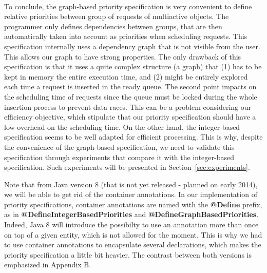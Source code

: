 \documentclass[11pt]{report}
\begin{document}

\paragraph{}
To conclude, the graph-based priority specification is very convenient to define relative priorities between group of requests of multiactive objects. The programmer only defines dependencies between groups, that are then automatically taken into account as priorities when scheduling requests. This specification internally uses a dependency graph that is not visible from the user. This allows our graph to have strong properties. The only drawback of this specification is that it uses a quite complex structure (a graph) that (1) has to be kept in memory the entire execution time, and (2) might be entirely explored each time a request is inserted in the ready queue. The second point impacts on the scheduling time of requests since the queue must be locked during the whole insertion process to prevent data races. This can be a problem considering our efficiency objective, which stipulate that our priority specification should have a low overhead on the scheduling time. On the other hand, the integer-based specification seems to be well adapted for efficient processing. This is why, despite the convenience of the graph-based specification, we need to validate this specification through experiments that compare it with the integer-based specification. Such experiments will be presented in Section~\ref{sec:experiments}.

Note that from Java version 8 (that is not yet released - planned on early 2014), we will be able to get rid of the container annotations. In our implementation of priority specifications, container annotations are named with the \textbf{@Define} prefix, as in \textbf{@DefineIntegerBasedPriorities} and \textbf{@DefineGraphBasedPriorities}. Indeed, Java 8 will introduce the possibilty to use an annotation more than once on top of a given entity, which is not allowed for the moment. This is why we had to use container annotations to encapsulate several declarations, which makes the priority specification a little bit heavier. The contrast between both versions is emphasized in Appendix B.
\end{document}
